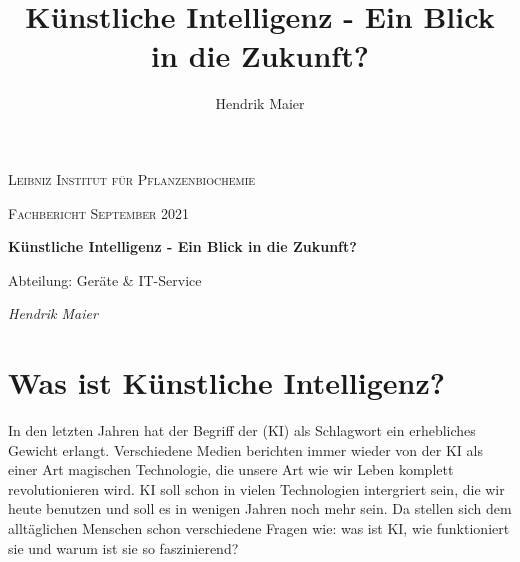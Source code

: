 \documentclass[a4paper,12pt,german,ngerman]{report}
\title{Künstliche Intelligenz - Ein Blick in die Zukunft?}
\author{Hendrik Maier}
\date{}
\begin{document}
    \begin{titlepage}
        \centering
        {\scshape\LARGE Leibniz Institut für Pflanzenbiochemie\par}
        \vspace{1cm}
        {\scshape\Large Fachbericht September 2021\par}
        \vspace{1.5cm}
        {\huge\bfseries Künstliche Intelligenz - Ein Blick in die Zukunft?\par}
        \vspace{2cm}
        {\Large Abteilung: Geräte \& IT-Service\par}
        \vspace{1.5cm}
        {\Large\itshape Hendrik Maier\par}
        \vfill

    \end{titlepage}

    \tableofcontents
    \newpage

    \chapter{Was ist Künstliche Intelligenz?}
    In den letzten Jahren hat der Begriff der  (KI) als Schlagwort ein erhebliches Gewicht
    erlangt. Verschiedene Medien berichten immer wieder von der KI als einer Art magischen Technologie, die unsere
    Art wie wir Leben komplett revolutionieren wird. KI soll schon in vielen Technologien intergriert sein, die wir heute
    benutzen und soll es in wenigen Jahren noch mehr sein. Da stellen sich dem alltäglichen Menschen schon
    verschiedene Fragen wie: was ist KI, wie funktioniert sie und warum ist sie so faszinierend?\\
\end{document}
